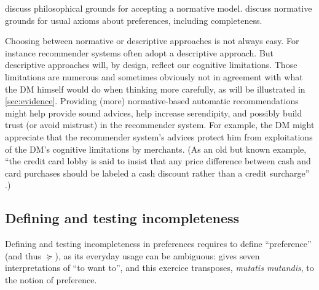 \documentclass[french, english]{llncs}
\begin{document}
\citet{mcclennen_rationality_1990, guala_logic_2000} discuss philosophical grounds for accepting a normative model. \citet{anand_are_1987, mandler_difficult_2001} discuss normative grounds for usual axioms about preferences, including completeness.

Choosing between normative or descriptive approaches is not always easy. For instance recommender systems often adopt a descriptive approach. 
But descriptive approaches will, by design, reflect our cognitive limitations. Those limitations are numerous and sometimes obviously not in agreement with what the \ac{DM} himself would do when thinking more carefully, as will be illustrated in \cref{sec:evidence}. 
Providing (more) normative-based automatic recommendations might help provide sound advices, help increase serendipity, and possibly build trust (or avoid mistrust) in the recommender system. For example, the \ac{DM} might appreciate that the recommender system’s advices protect him from exploitations of the \ac{DM}’s cognitive limitations by merchants. (As an old but known example, “the credit card lobby is said to insist that any price difference between cash and card purchases should be labeled a cash discount rather than a credit surcharge” \citep{tversky_rational_1986}.) 
	
\subsection{Defining and testing incompleteness}
\label{sec:empirical}
Defining and testing incompleteness in preferences requires to define “preference” (and thus $\succeq$), as its everyday usage can be ambiguous: \citet{frankfurt_freedom_1971} gives seven interpretations of “to want to”, and this exercice transposes, \emph{mutatis mutandis}, to the notion of preference.
	
	
\end{document}

